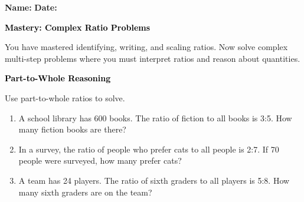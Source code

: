 \documentclass[12pt, letterpaper, fleqn]{article}
\begin{document}
\textbf{Name:} \underline{\hspace{5cm}}
\hfill
\textbf{Date:} \underline{\hspace{3cm}}\\

\begin{tcolorbox}[colback=customteal!20]
    \large\textcolor{black}{\textbf{Mastery: Complex Ratio Problems}}
\end{tcolorbox}

\vspace{3mm}

\noindent
You have mastered identifying, writing, and scaling ratios. Now solve complex multi-step problems where you must interpret ratios and reason about quantities.

\vspace{4mm}

\begin{tcolorbox}[colback=customteal!20]
\large\textcolor{black}{\textbf{Part-to-Whole Reasoning}}
\end{tcolorbox}

\noindent
Use part-to-whole ratios to solve.

\vspace{3mm}

\begin{enumerate}[itemsep=2cm, leftmargin=0.6cm]

\item A school library has 600 books. The ratio of fiction to all books is 3:5. How many fiction books are there?

\vspace{1.8cm}

\item In a survey, the ratio of people who prefer cats to all people is 2:7. If 70 people were surveyed, how many prefer cats?

\vspace{1.8cm}

\item A team has 24 players. The ratio of sixth graders to all players is 5:8. How many sixth graders are on the team?

\vspace{1.8cm}

\end{enumerate}
\end{document}
